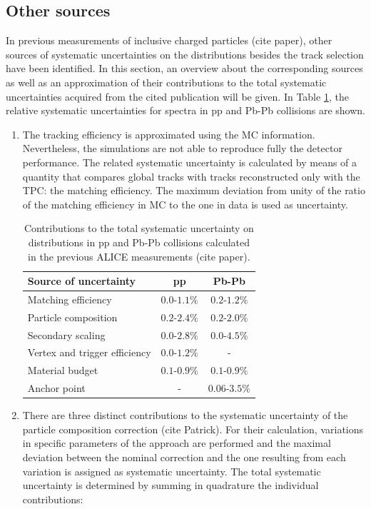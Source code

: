 \documentclass[12pt,a4paper]{report}
\begin{document}
\subsection{Other sources} 
In previous measurements of inclusive charged particles (cite paper), other sources of systematic uncertainties on the \pt distributions besides the track selection have been identified. In this section, an overview about the corresponding sources as well as an approximation of their contributions to the total systematic uncertainties acquired from the cited publication will be given. In Table \ref{tab:othersources}, the relative systematic uncertainties for \pt spectra in pp and Pb-Pb collisions are shown. 
\begin{enumerate} 
\item The tracking efficiency is approximated using the MC information. Nevertheless, the simulations are not able  to reproduce fully the detector performance. The related systematic uncertainty is calculated by means of a quantity that compares global tracks with tracks reconstructed only with the TPC: the matching efficiency. The maximum deviation from unity of the ratio of the matching efficiency in MC to the one in data is used as uncertainty.
\begin{table}[tb!]
\renewcommand{\arraystretch}{1.5}
\centering
\begin{tabular}{l c c}
\toprule
\rowcolor{headerBlue}  \textbf{Source of uncertainty} &  \textbf{pp}  &   \textbf{Pb-Pb}  \\
\midrule
\midrule
Matching efficiency & $0.0$-$1.1\%$  & $0.2$-$1.2\%$\\
Particle composition & $0.2$-$2.4\%$ & $0.2$-$2.0\%$\\
Secondary scaling & $0.0$-$2.8\%$ & $0.0$-$4.5\%$ \\
Vertex and trigger efficiency & $0.0$-$1.2\%$ & - \\
Material budget & $0.1$-$0.9\%$ & $0.1$-$0.9\%$ \\
Anchor point & - & $0.06$-$3.5\%$ \\
\bottomrule
\end{tabular}
\caption{Contributions to the total systematic uncertainty on \pt distributions in pp and Pb-Pb collisions calculated in the previous ALICE measurements (cite paper).}
\label{tab:othersources}
\end{table}
\item There are three distinct contributions to the systematic uncertainty of the particle composition correction (cite Patrick). For their calculation, variations in specific parameters of the approach are performed and the maximal deviation between the nominal correction and the one resulting from each variation is assigned as systematic uncertainty. The total systematic uncertainty is determined by summing in quadrature the individual contributions:

\end{enumerate}
\end{document}
